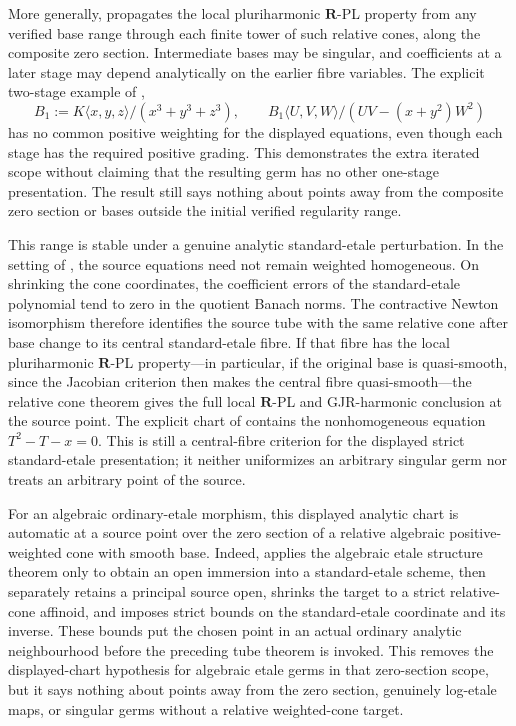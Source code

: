 More generally,
 propagates the local
pluriharmonic \(\mathbf R\)-PL property from any verified base range through
each finite tower of such relative cones, along the composite zero section.
Intermediate bases may be singular, and coefficients at a later stage may
depend analytically on the earlier fibre variables.  The explicit two-stage
example of ,
\[
 B_1:=K\langle x,y,z\rangle/(x^3+y^3+z^3),\qquad
 B_1\langle U,V,W\rangle/(UV-(x+y^2)W^2)
\]
has no common positive weighting for the displayed equations, even though
each stage has the required positive grading.  This demonstrates the extra
iterated scope without claiming that the resulting germ has no other
one-stage presentation.  The result still says nothing about points away
from the composite zero section or bases outside the initial verified
regularity range.

This range is stable under a genuine analytic standard-etale perturbation.
In the setting of
, the source equations
need not remain weighted homogeneous.  On shrinking the cone coordinates,
the coefficient errors of the standard-etale polynomial tend to zero in
the quotient Banach norms.  The contractive Newton isomorphism therefore
identifies the source tube with the same relative cone after base change to
its central standard-etale fibre.  If that fibre has the local
pluriharmonic \(\mathbf R\)-PL property---in particular, if the original
base is quasi-smooth, since the Jacobian criterion then makes the central
fibre quasi-smooth---the relative cone theorem gives the full local
\(\mathbf R\)-PL and GJR-harmonic conclusion at the source point.  The
explicit chart of
 contains the
nonhomogeneous equation \(T^2-T-x=0\).  This is still a central-fibre
criterion for the displayed strict standard-etale presentation; it neither
uniformizes an arbitrary singular germ nor treats an arbitrary point of the
source.

For an algebraic ordinary-etale morphism, this displayed analytic chart is
automatic at a source point over the zero section of a relative algebraic
positive-weighted cone with smooth base.  Indeed,
 applies the
algebraic etale structure theorem only to obtain an open immersion into a
standard-etale scheme, then separately retains a principal source open,
shrinks the target to a strict relative-cone affinoid, and imposes strict
bounds on the standard-etale coordinate and its inverse.  These bounds put
the chosen point in an actual ordinary analytic neighbourhood before the
preceding tube theorem is invoked.  This removes the displayed-chart
hypothesis for algebraic etale germs in that zero-section scope, but it says
nothing about points away from the zero section, genuinely log-etale maps,
or singular germs without a relative weighted-cone target.

